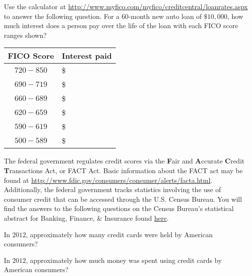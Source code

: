 \documentclass{ximera}
\begin{document}
\begin{question}
Use the calculator at \href{http://www.myfico.com/myfico/creditcentral/loanrates.aspx}{http://www.myfico.com/myfico/creditcentral/loanrates.aspx} to answer the following question. For a 60-month new auto loan of $\$10,000$, how much interest does a person pay over the life of the loan with each FICO score ranges shown?

\begin{freeResponse}
\begin{tabular}{@{}cl@{}}\toprule
 \textbf{FICO Score} & \textbf{Interest paid}\\\midrule
$720-850$ & \$\\
$690-719$ & \$\\
$660-689$ & \$\\
$620-659$ & \$\\
$590-619$ & \$\\
$500-589$ & \$\\
\bottomrule
\end{tabular}
\end{freeResponse}
\end{question}

The federal government regulates credit scores via the \textbf{F}air and \textbf{A}ccurate \textbf{C}redit \textbf{T}ransactions Act, or FACT Act. Basic information about the FACT act may be found at \href{http://www.fdic.gov/consumers/consumer/alerts/facta.html}{http://www.fdic.gov/consumers/consumer/alerts/facta.html}. Additionally, the federal government tracks statistics involving the use of consumer credit that can be accessed through the U.S. Census Bureau. You will find the answers to the following questions on the Census Bureau's statistical abstract for Banking, Finance, \& Insurance found \href{http://www.census.gov/compendia/statab/cats/banking_finance_insurance/payment_systems_consumer_credit_mortgage_debt.html}{here}.


\begin{question}
In $2012$, approximately how many credit cards were held by American consumers?
    \begin{multipleChoice}
    \end{multipleChoice}
\end{question}

\begin{question}
In $2012$, approximately how much money was spent using credit cards by American consumers?
    \begin{multipleChoice}
    \end{multipleChoice}
\end{question}
\end{document}
